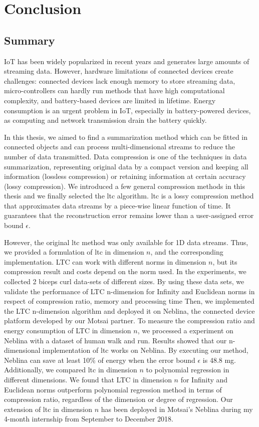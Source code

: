 \chapter{Conclusion}


\section{Summary}


IoT has been widely popularized in recent years and generates large amounts of
streaming data. However, hardware limitations of connected devices create
challenges: connected devices lack enough memory to store streaming data,
micro-controllers can hardly run methods that have high computational
complexity, and battery-based devices are limited in lifetime. Energy
consumption is an urgent problem in IoT, especially in battery-powered devices,
as computing and network transmission drain the battery quickly.

In this thesis, we aimed to find a summarization method which can be fitted
in connected objects and can process multi-dimensional streams to reduce
the number of data transmitted. Data compression is one of the techniques
in data summarization, representing original data by a compact version and
keeping all information (lossless compression) or retaining information at
certain accuracy (lossy compression). We introduced a few general
compression methods in this thesis and we finally selected the
\acrfull{ltc} algorithm. \acrshort{ltc} is a lossy compression method that
approximates data streams by a piece-wise linear function of time. It
guarantees that the reconstruction error remains lower than a user-assigned
error bound $\epsilon$. 

However, the original \acrshort{ltc} method was only available for 1D data
streams. Thus, we provided a formulation of \acrshort{ltc} in dimension $n$, and
the corresponding implementation. LTC can work with different norms in dimension
$n$, but its compression result and costs depend on the norm used. In the
experiments, we collected 2 biceps curl data-sets of different sizes. By using
these data sets, we validate the performance of LTC n-dimension for Infinity and
Euclidean norms in respect of compression ratio, memory and processing time
Then, we implemented the LTC n-dimension algorithm and deployed it on Neblina,
the connected device platform developed by our Motsai partner. To measure the
compression ratio and energy consumption of LTC in dimension $n$, we processed a
experiment on Neblina with a dataset of human walk and run. Results showed that
our n-dimensional implementation of \acrshort{ltc} works on Neblina. By
executing our method, Neblina can save at least 10\% of energy when the error
bound $\epsilon$ is 48.8 mg. 
Additionally, we compared \acrshort{ltc} in dimension $n$
to polynomial regression in different dimensions. We found that LTC in dimension
$n$ for Infinity and Euclidean norms outperform polynomial regression method in
terms of compression ratio, regardless of the dimension or degree of regression.
Our extension of \acrshort{ltc} in dimension $n$ has been deployed in Motsai's
Neblina during my 4-month internship from September to December 2018.

